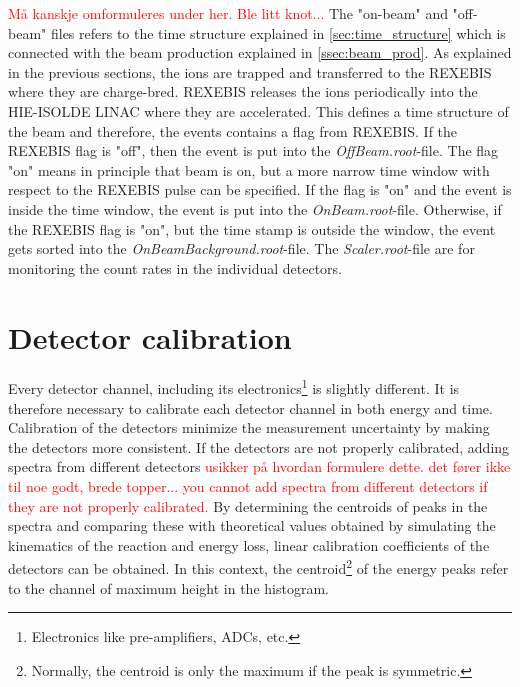 \documentclass[twoside,english]{uiofysmaster/uiofysmaster}
\newcommand{\ga}{$\gamma$}
\let\orgautoref\autoref
\renewcommand{\autoref}
        {%
		 \def\sectionautorefname{Section}%
		 \def\subsectionautorefname{Section}%
		 \def\subsubsectionautorefname{Section}%
		 \def\chapterautorefname{Chapter}%
          \orgautoref}
\begin{document}
\bigskip

\textcolor{red}{Må kanskje omformuleres under her. Ble litt knot...}\newline
The "on-beam" and "off-beam" files refers to the time structure explained in \autoref{sec:time_structure} which is connected with the beam production explained in \autoref{ssec:beam_prod}.
As explained in the previous sections, the ions are trapped and transferred to the REXEBIS where they are charge-bred.
REXEBIS releases the ions periodically into the HIE-ISOLDE LINAC where they are accelerated. 
This defines a time structure of the beam and therefore, the events contains a flag from REXEBIS.
If the REXEBIS flag is "off", then the event is put into the \textit{OffBeam.root}-file.
The flag "on" means in principle that beam is on, but a more narrow time window with respect to the REXEBIS pulse can be specified. 
If the flag is "on" and the event is inside the time window, the event is put into the \textit{OnBeam.root}-file.
Otherwise, if the REXEBIS flag is "on", but the time stamp is outside the window, the event gets sorted into the \textit{OnBeamBackground.root}-file.
The \textit{Scaler.root}-file are for monitoring the count rates in the individual detectors.



\section{Detector calibration}

Every detector channel, including its electronics\footnote{Electronics like pre-amplifiers, ADCs, etc.} is slightly different. 
It is therefore necessary to calibrate each detector channel in both energy and time.
Calibration of the detectors minimize the measurement uncertainty by making the detectors more consistent.
If the detectors are not properly calibrated, adding spectra from different detectors \textcolor{red}{usikker på hvordan formulere dette. det fører ikke til noe godt, brede topper... you cannot add spectra from different detectors if they are not properly calibrated.}
By determining the centroids of peaks in the spectra and comparing these with theoretical values obtained by simulating the kinematics of the reaction and energy loss, linear calibration coefficients of the detectors can be obtained. 
In this context, the centroid\footnote{Normally, the centroid is only the maximum if the peak is symmetric.} of the energy peaks refer to the channel of maximum height in the histogram.
\end{document}
